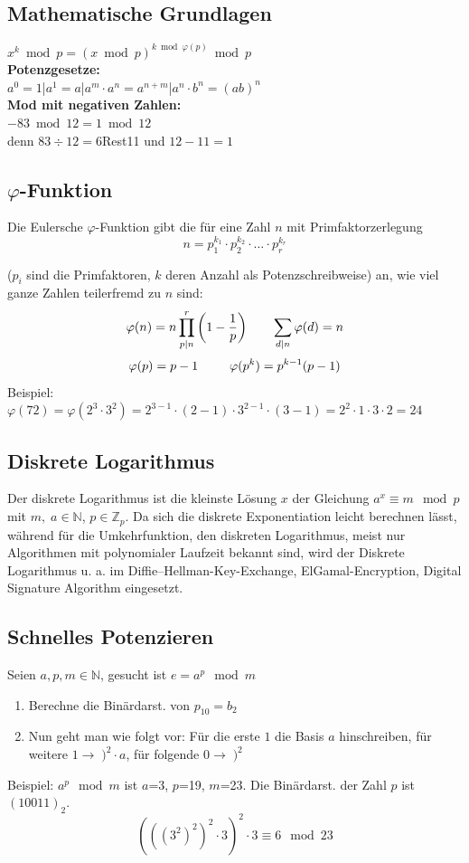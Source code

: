 \documentclass[8pt,a4paper,landscape]{article}
\begin{document}
\begin{multicols}{4}
\section{Mathematische Grundlagen}

$x^k \bmod p = \left( x \bmod p \right)^{k \bmod \varphi(p)} \bmod p$\\
\textbf{Potenzgesetze:} \\$a^0=1$|$a^1=a$|$a^m \cdot a^n = a^{n+m}$|$a^n \cdot b^n = (ab)^n$\\
\textbf{Mod mit negativen Zahlen:} \\$-83 \bmod 12 = 1 \bmod 12$ \\denn $83 \div 12 = 6$Rest11 und $12-11=1$
\subsection{$\varphi$-Funktion}
Die Eulersche $\varphi$-Funktion gibt die für eine Zahl $n$ mit Primfaktorzerlegung 
\[n = p_{1}^{k_1} \cdot p_{2}^{k_2} \cdot \ldots \cdot p_{r}^{k_r}\]

($p_{i}$ sind die Primfaktoren, $k$ deren Anzahl als Potenzschreibweise) an, wie viel ganze Zahlen teilerfremd zu \(n\) sind:
\[\varphi(n) = n\prod_{p|n}^{r}\left (1 - \frac{1}{p}\right)\thickspace\thickspace\thickspace\thickspace\thickspace\thickspace\thickspace\sum_{d \vert n} \varphi(d) = n  \]
\[\varphi(p) = p - 1\thickspace\thickspace\thickspace\thickspace\thickspace\thickspace\thickspace\thickspace\thickspace\varphi(p^k) = p^{k-1}(p-1) \]
Beispiel: 
$\varphi(72) = \varphi(2^3\cdot3^2)=2^{3-1}\cdot(2-1)\cdot3^{2-1}\cdot(3-1)=2^2\cdot1\cdot3\cdot2=24$

\subsection{Diskrete Logarithmus}
Der diskrete Logarithmus ist die kleinste Lösung $x$ der Gleichung $a^x \equiv m \mod p$ mit $m, \;a \in \mathbb{N}$, $p \in \mathbb{Z}_p$. Da sich die diskrete Exponentiation leicht berechnen lässt, während für die Umkehrfunktion, den diskreten Logarithmus, meist nur Algorithmen mit polynomialer Laufzeit bekannt sind, wird der Diskrete Logarithmus u. a. im Diffie–Hellman-Key-Exchange, ElGamal-Encryption, Digital Signature Algorithm eingesetzt.

\subsection{Schnelles Potenzieren}
Seien \(a,{}p,{}m \in \mathbb{N}\), gesucht ist \(e=a^{p} \mod m\)
\begin{enumerate}
\item Berechne die Binärdarst. von \(p_{10} = b_2\)
\item Nun geht man wie folgt vor: Für die erste $1$ die Basis $a$ hinschreiben, für weitere \(1 \rightarrow \; )^2 \cdot a\), für folgende \(0 \rightarrow \; )^2\)
\end{enumerate}
Beispiel: $a^{p} \mod m$ ist $a$=3, $p$=19, $m$=23. Die Binärdarst. der Zahl $p$ ist \((10011)_{2}\). %
\[(((3^2)^2)^2 \cdot 3)^2 \cdot 3 \equiv 6 \mod23\] 


\end{multicols}
\end{document}
